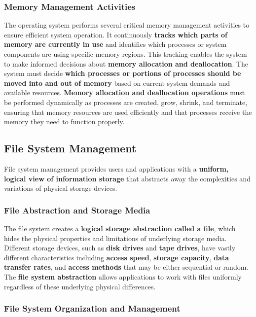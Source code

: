 \subsubsection{Memory Management Activities}

The operating system performs several critical memory management activities to ensure efficient system operation. It continuously \textbf{tracks which parts of memory are currently in use} and identifies which processes or system components are using specific memory regions. This tracking enables the system to make informed decisions about \textbf{memory allocation and deallocation}.
The system must decide \textbf{which processes or portions of processes should be moved into and out of memory} based on current system demands and available resources. \textbf{Memory allocation and deallocation operations} must be performed dynamically as processes are created, grow, shrink, and terminate, ensuring that memory resources are used efficiently and that processes receive the memory they need to function properly.


\subsection{File System Management}

File system management provides users and applications with a \textbf{uniform, logical view of information storage} that abstracts away the complexities and variations of physical storage devices.


\subsubsection{File Abstraction and Storage Media}

The file system creates a \textbf{logical storage abstraction called a file}, which hides the physical properties and limitations of underlying storage media. Different storage devices, such as \textbf{disk drives} and \textbf{tape drives}, have vastly different characteristics including \textbf{access speed}, \textbf{storage capacity}, \textbf{data transfer rates}, and \textbf{access methods} that may be either sequential or random. The \textbf{file system abstraction} allows applications to work with files uniformly regardless of these underlying physical differences.


\subsubsection{File System Organization and Management}

